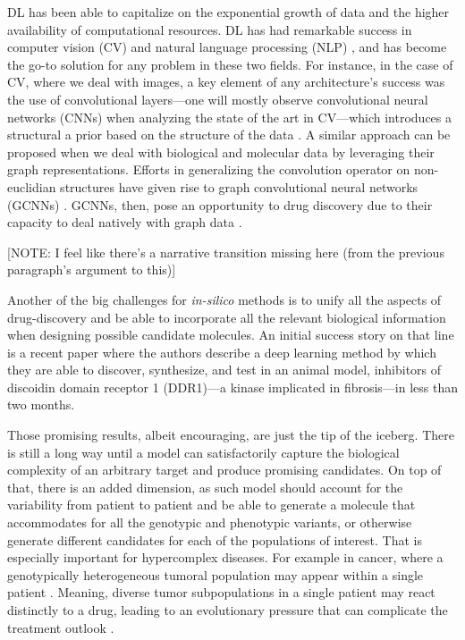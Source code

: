\documentclass{article}
\begin{document}
DL has been able to capitalize on the exponential growth of data and the higher
 availability of computational resources. DL has had remarkable success in computer
 vision (CV) \cite{Guo2016} and natural language processing (NLP) \cite{Young2018}, and
 has become the go-to solution for any problem in these two fields. For instance, in the
 case of CV, where we deal with images, a key element of any architecture's success was
 the use of convolutional layers---one will mostly observe convolutional neural networks
 (CNNs) when analyzing the state of the art in CV---which introduces a structural a
 prior based on the structure of the data \cite{Fukushima1980, LeCun1989, Ulyanov}. A
 similar approach can be proposed when we deal with biological and molecular data by
 leveraging their graph representations. Efforts in generalizing the convolution
 operator on non-euclidian structures have given rise to graph convolutional neural
 networks (GCNNs) \cite{Wu2019}. GCNNs, then, pose an opportunity to drug discovery due
 to their capacity to deal natively with graph data \cite{Sun2019}.

{\color{red} [NOTE: I feel like there's a narrative transition missing here (from the
previous paragraph's argument to this)]}

{\color{red}Another of the big challenges for \emph{in-silico} methods is to unify all
 the aspects of drug-discovery and be able to incorporate all the relevant biological
 information when designing possible candidate molecules.} An initial success story on
 that line is a recent paper \cite{Zhavoronkov2019} where the authors describe a deep
 learning method by which they are able to discover, synthesize, and test in an animal
 model, inhibitors of discoidin domain receptor 1 (DDR1)—a kinase implicated in
 fibrosis—in less than two months.

Those promising results, albeit encouraging, are just the tip of the iceberg. There is
 still a long way until a model can satisfactorily capture the biological complexity of
 an arbitrary target and produce promising candidates. On top of that, there is an added
 dimension, as such model should account for the variability from patient to patient and
 be able to generate a molecule that accommodates for all the genotypic and phenotypic
 variants, or otherwise generate different candidates for each of the populations of
 interest. That is especially important for hypercomplex diseases. For example in
 cancer, where a genotypically heterogeneous tumoral population may appear within a
 single patient \cite{Boland2017}. Meaning, diverse tumor subpopulations in a single
 patient may react distinctly to a drug, leading to an evolutionary pressure that can
 complicate the treatment outlook \cite{Enriquez-Navas2015}.
\end{document}

